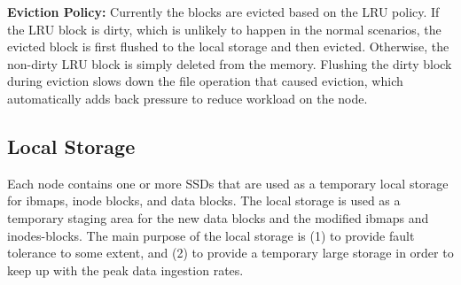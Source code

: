 \documentclass[]{article}
\newcommand{\subtopic}[1]{\vspace{1.5pt} \noindent \textbf{#1}}
\begin{document}
\subtopic{Eviction Policy:} Currently the blocks are evicted based on the LRU
policy.  If the LRU block is dirty, which is unlikely to happen in the normal
scenarios, the evicted block is first flushed to the local storage and then
evicted. Otherwise, the non-dirty LRU block is simply deleted from the memory.
Flushing the dirty block during eviction  slows down the file operation that
caused eviction, which automatically adds back pressure to reduce workload on
the node.


%
%
%


%
%
%
%

\subsection{Local Storage} Each node contains one or more SSDs that are used as
a temporary local storage for ibmaps, inode blocks, and data blocks.  The local
storage is used as a temporary staging area for the new data blocks and the
modified ibmaps and inodes-blocks.  The main purpose of the local storage is
(1) to provide fault tolerance to some extent, and (2) to provide a temporary 
large storage in order to keep up with the peak data ingestion rates.
\end{document}
